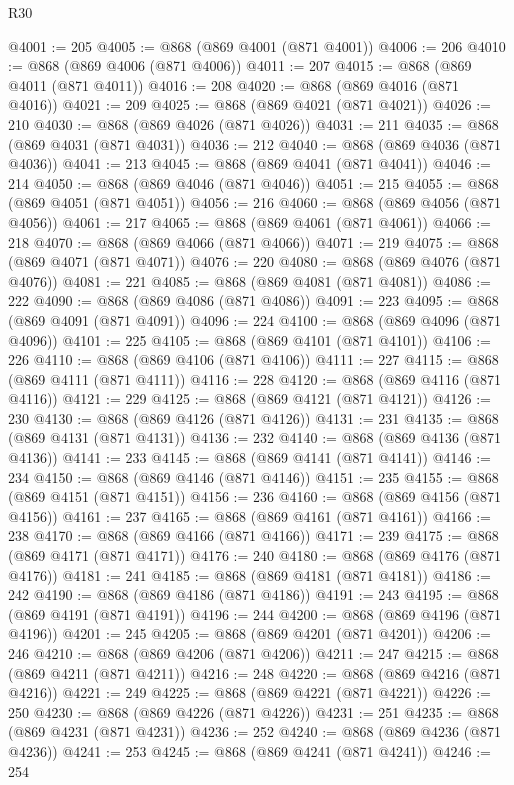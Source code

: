 \begin{lexlean}{R30}
\begin{coremodule}
@4001 := 205
@4005 := @868 (@869 @4001 (@871 @4001))
@4006 := 206
@4010 := @868 (@869 @4006 (@871 @4006))
@4011 := 207
@4015 := @868 (@869 @4011 (@871 @4011))
@4016 := 208
@4020 := @868 (@869 @4016 (@871 @4016))
@4021 := 209
@4025 := @868 (@869 @4021 (@871 @4021))
@4026 := 210
@4030 := @868 (@869 @4026 (@871 @4026))
@4031 := 211
@4035 := @868 (@869 @4031 (@871 @4031))
@4036 := 212
@4040 := @868 (@869 @4036 (@871 @4036))
@4041 := 213
@4045 := @868 (@869 @4041 (@871 @4041))
@4046 := 214
@4050 := @868 (@869 @4046 (@871 @4046))
@4051 := 215
@4055 := @868 (@869 @4051 (@871 @4051))
@4056 := 216
@4060 := @868 (@869 @4056 (@871 @4056))
@4061 := 217
@4065 := @868 (@869 @4061 (@871 @4061))
@4066 := 218
@4070 := @868 (@869 @4066 (@871 @4066))
@4071 := 219
@4075 := @868 (@869 @4071 (@871 @4071))
@4076 := 220
@4080 := @868 (@869 @4076 (@871 @4076))
@4081 := 221
@4085 := @868 (@869 @4081 (@871 @4081))
@4086 := 222
@4090 := @868 (@869 @4086 (@871 @4086))
@4091 := 223
@4095 := @868 (@869 @4091 (@871 @4091))
@4096 := 224
@4100 := @868 (@869 @4096 (@871 @4096))
@4101 := 225
@4105 := @868 (@869 @4101 (@871 @4101))
@4106 := 226
@4110 := @868 (@869 @4106 (@871 @4106))
@4111 := 227
@4115 := @868 (@869 @4111 (@871 @4111))
@4116 := 228
@4120 := @868 (@869 @4116 (@871 @4116))
@4121 := 229
@4125 := @868 (@869 @4121 (@871 @4121))
@4126 := 230
@4130 := @868 (@869 @4126 (@871 @4126))
@4131 := 231
@4135 := @868 (@869 @4131 (@871 @4131))
@4136 := 232
@4140 := @868 (@869 @4136 (@871 @4136))
@4141 := 233
@4145 := @868 (@869 @4141 (@871 @4141))
@4146 := 234
@4150 := @868 (@869 @4146 (@871 @4146))
@4151 := 235
@4155 := @868 (@869 @4151 (@871 @4151))
@4156 := 236
@4160 := @868 (@869 @4156 (@871 @4156))
@4161 := 237
@4165 := @868 (@869 @4161 (@871 @4161))
@4166 := 238
@4170 := @868 (@869 @4166 (@871 @4166))
@4171 := 239
@4175 := @868 (@869 @4171 (@871 @4171))
@4176 := 240
@4180 := @868 (@869 @4176 (@871 @4176))
@4181 := 241
@4185 := @868 (@869 @4181 (@871 @4181))
@4186 := 242
@4190 := @868 (@869 @4186 (@871 @4186))
@4191 := 243
@4195 := @868 (@869 @4191 (@871 @4191))
@4196 := 244
@4200 := @868 (@869 @4196 (@871 @4196))
@4201 := 245
@4205 := @868 (@869 @4201 (@871 @4201))
@4206 := 246
@4210 := @868 (@869 @4206 (@871 @4206))
@4211 := 247
@4215 := @868 (@869 @4211 (@871 @4211))
@4216 := 248
@4220 := @868 (@869 @4216 (@871 @4216))
@4221 := 249
@4225 := @868 (@869 @4221 (@871 @4221))
@4226 := 250
@4230 := @868 (@869 @4226 (@871 @4226))
@4231 := 251
@4235 := @868 (@869 @4231 (@871 @4231))
@4236 := 252
@4240 := @868 (@869 @4236 (@871 @4236))
@4241 := 253
@4245 := @868 (@869 @4241 (@871 @4241))
@4246 := 254

\end{coremodule}
\end{lexlean}

